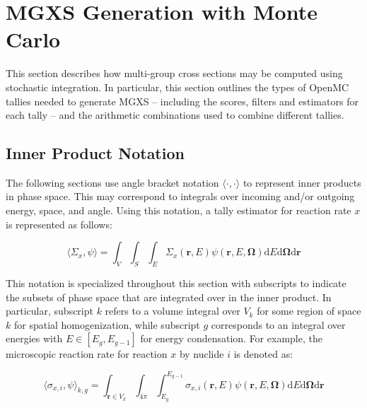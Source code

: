 \section{MGXS Generation with Monte Carlo}
\label{sec:mgxs-mc}

This section describes how multi-group cross sections may be computed using stochastic integration. In particular, this section outlines the types of OpenMC tallies needed to generate MGXS -- including the scores, filters and estimators for each tally -- and the arithmetic combinations used to combine different tallies.

\subsection{Inner Product Notation}
\label{subsubsec:tally-types-notation}

The following sections use angle bracket notation $\langle \cdot , \cdot \rangle$ to represent inner products in phase space. This may correspond to integrals over incoming and/or outgoing energy, space, and angle. Using this notation, a tally estimator for reaction rate $x$ is represented as follows:

\begin{equation}
\label{eqn:inner-prod}
\langle \Sigma_x, \psi \rangle = \int_{V} \int_{S} \int_{E} \Sigma_{x}(\mathbf{r},E)\psi(\mathbf{r},E,\mathbf{\Omega}) \mathrm{d}E\mathrm{d}\mathbf{\Omega}\mathrm{d}\mathbf{r}
\end{equation}

\noindent This notation is specialized throughout this section with subscripts to indicate the subsets of phase space that are integrated over in the inner product. In particular, subscript $k$ refers to a volume integral over $V_{k}$ for some region of space $k$ for spatial homogenization, while subscript $g$ corresponds to an integral over energies with $E \in [E_{g}, E_{g-1}]$ for energy condensation. For example, the microscopic reaction rate for reaction $x$ by nuclide $i$ is denoted as:

\begin{equation}
\label{eqn:angle-rxn-rate}
\langle \sigma_{x,i}, \psi \rangle_{k,g} = \int_{\mathbf{r} \in V_{k}} \int_{4\pi} \int_{E_{g}}^{E_{g-1}} \sigma_{x,i}(\mathbf{r},E)\psi(\mathbf{r},E,\mathbf{\Omega}) \mathrm{d}E\mathrm{d}\mathbf{\Omega}\mathrm{d}\mathbf{r}
\end{equation}

